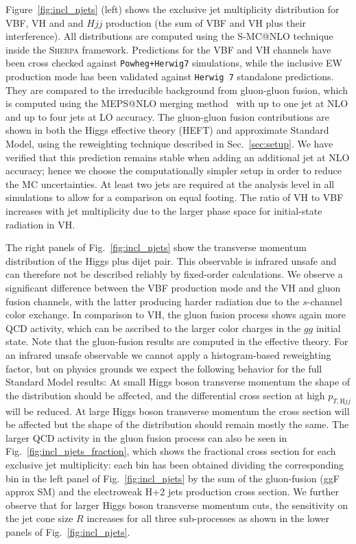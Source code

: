 \documentclass[10pt,prd,fleqn,superscriptaddress,notitlepage,nofootinbib,preprintnumbers,nobalancelastpage]{revtex4-1}
\newcommand{\HW}{\texttt{Herwig 7}\xspace}
\newcommand{\Sherpa}{\textsc{Sherpa}\xspace}
\newcommand{\VBF}{VBF\xspace}
\newcommand{\VH}{VH\xspace}
\begin{document}
Figure~\ref{fig:incl_njets} (left) shows the exclusive jet multiplicity distribution for \VBF, \VH and and $Hjj$ production (the sum of \VBF and \VH plus their interference). All distributions are computed using the S-MC@NLO technique inside the \Sherpa{} framework.
Predictions for the \VBF and \VH channels have been cross checked against {\tt Powheg+Herwig7} simulations, while the inclusive EW production mode
has been validated against \HW{} standalone predictions.
They are compared to the irreducible background from gluon-gluon fusion, which is computed using the MEPS@NLO merging method~\cite{Gehrmann:2012yg,Hoeche:2012yf} with up to one jet at NLO and up to four jets at LO accuracy. The gluon-gluon fusion contributions are shown in both the Higgs effective theory (HEFT) and approximate Standard Model, using the reweighting technique described in Sec.~\ref{sec:setup}.  We have verified that this prediction remains stable when adding an additional jet at NLO accuracy; hence we choose the computationally simpler setup in order to reduce the MC uncertainties. At least two jets are required at the analysis level in all simulations to allow for a comparison on equal footing.
The ratio of \VH to \VBF increases with jet multiplicity due to the larger phase space for initial-state radiation in \VH.

The right panels of Fig.~\ref{fig:incl_njets} show the transverse momentum distribution of the Higgs plus dijet pair. This observable is infrared unsafe and can therefore not be described reliably by fixed-order calculations. We observe a significant difference between the \VBF production mode and the \VH and gluon fusion channels, with the latter producing harder radiation due to the $s$-channel color exchange. In comparison to \VH, the gluon fusion process shows again more QCD activity, which can be ascribed to the larger color charges in the $gg$ initial state. Note that the gluon-fusion results are computed in the effective theory. For an infrared unsafe observable we cannot apply a histogram-based reweighting factor, but on physics grounds we expect the following behavior for the full Standard Model results: At small Higgs boson transverse momentum the shape of the distribution should be affected, and the differential cross section at high $p_{T, \text{H}jj}$ will be reduced. At large Higgs boson transverse momentum the cross section will be affected but the shape of the distribution should remain mostly the same. 
The larger QCD activity in the gluon fusion process can also be seen in Fig.~\ref{fig:incl_njets_fraction}, which shows the fractional cross section for each exclusive jet multiplicity: each bin
has been obtained dividing the corresponding bin
in the left panel of Fig.~\ref{fig:incl_njets} by the sum of the gluon-fusion (ggF approx SM) and the electroweak H+2 jets production cross section.
We further observe that for larger Higgs boson transverse momentum cuts, the sensitivity on the jet cone size $R$ increases for all three sub-processes as shown in the lower panels of Fig.~\ref{fig:incl_njets}.
\end{document}
